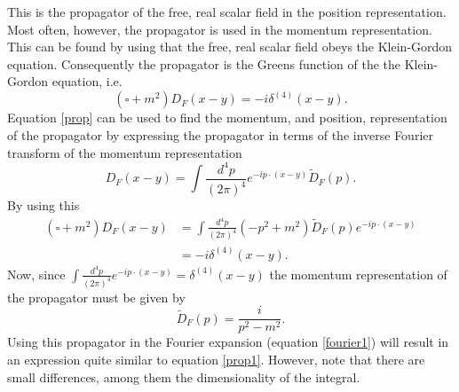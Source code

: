 \begin{enumerate}
	This is the propagator of the free, real scalar field in the position representation. Most often, however, the propagator is used in the momentum representation. This can be found by using that the free, real scalar field obeys the Klein-Gordon equation. Consequently the propagator is the Greens function of the the Klein-Gordon equation,  i.e.
	\begin{equation}
		(\square+m^2)D_F(x-y)=-i\delta^{(4)}(x-y).
		\label{prop}
	\end{equation} 
	Equation \eqref{prop} can be used to find the momentum, and position, representation of the propagator by expressing the propagator in terms of the inverse Fourier transform of the momentum representation
	\begin{equation}
		D_F(x-y)=\int \frac{d^4p}{(2\pi)^4}e^{-ip\cdot(x-y)}\tilde{D}_F(p).
		\label{fourier1}
	\end{equation} 
	By using this
	\begin{equation}
		\begin{split}
			(\square+m^2)D_F(x-y)&=\int\frac{d^4p}{(2\pi)^4}(-p^2+m^2)\tilde{D}_F(p)e^{-ip\cdot(x-y)}\\
			&=-i\delta^{(4)}(x-y).
		\end{split}
	\end{equation} 
	Now, since $\int \frac{d^4p}{(2\pi)^4}e^{-ip\cdot(x-y)}=\delta^{(4)}(x-y)$ the momentum representation of the propagator must be given by
	\begin{equation}
		\tilde{D}_F(p)=\frac{i}{p^2-m^2}.
	\end{equation} 
	Using this propagator in the Fourier expansion (equation \eqref{fourier1}) will result in an expression quite similar to equation \eqref{prop1}. However, note that there are small differences, among them the dimensionality of the integral.
\end{enumerate}

